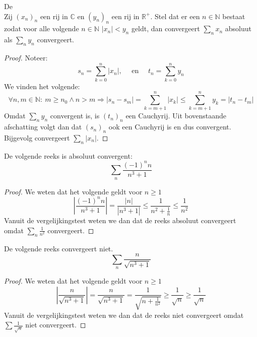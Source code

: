 \documentclass[main.tex]{subfiles}
\begin{document}
\begin{bst}
  \label{st:vergelijkingstest}
  De \\
  Zij $(x_{n})_{n}$ een rij in $\mathbb{C}$ en $(y_{n})_{n}$ een rij in $\mathbb{R}^{+}$.
  Stel dat er een $n\in \mathbb{N}$ bestaat zodat voor alle volgende $n\in \mathbb{N}$ $|x_{n}| < y_{n}$ geldt, dan convergeert $\sum_{n}x_{n}$ absoluut als $\sum_{n}y_{n}$ convergeert.

  \begin{proof}
    Noteer:
    \[ 
    s_{n} = \sum_{k=0}^{n}|x_{n}|,\quad
    \text{ en }\quad
    t_{n} = \sum_{k=0}^{n}y_{n}
    \]
    We vinden het volgende:
    \[ \forall n,m\in \mathbb{N}:\ m \ge n_{0} \wedge n > m \Rightarrow |s_{n}-s_{m}| = \sum_{k=m+1}^{n}|x_{k}| \le \sum_{k=m+1}^{n}y_{k} = |t_{n}-t_{m}| \]
    Omdat $\sum_{n}y_{n}$ convergent is, is $(t_{n})_{n}$ een Cauchyrij.
    Uit bovenstaande afschatting volgt dan dat $(s_{n})_{n}$ ook een Cauchyrij is en dus convergent.
    Bijgevolg convergeert $\sum_{n}|x_{n}|$.
  \end{proof}
\end{bst}

\begin{vb}
  De volgende reeks is absoluut convergent:
  \[ \sum_{n}\frac{(-1)^{n}n}{n^{3}+1} \]
  
  \begin{proof}
    We weten dat het volgende geldt voor $n\ge 1$
    \[
    \left| \frac{(-1)^{n}n}{n^{3}+1} \right|
    = \frac{|n|}{|n^{3}+1|}
    \le \frac{1}{n^{2}+ \frac{1}{n}}
    \le \frac{1}{n^{2}} \]
    Vanuit de vergelijkingstest weten we dan dat de reeks absoluut convergeert omdat $\sum_{n}\frac{1}{n^{2}}$ convergeert.
  \end{proof}
\end{vb}

\begin{vb}
  De volgende reeks convergeert niet.
  \[ \sum_{n}\frac{n}{\sqrt{n^{3}+1}} \]

  \begin{proof}
    We weten dat het volgende geldt voor $n\ge 1$
    \[
    \left| \frac{n}{\sqrt{n^{3}+1}}\right|
    = \frac{n}{\sqrt{n^{3}+1}}
    = \frac{1}{\sqrt{n + \frac{1}{n^{2}}}}
    \ge \frac{1}{\sqrt{n}}
    \ge \frac{1}{\sqrt{n}}
    \]
    Vanuit de vergelijkingstest weten we dan dat de reeks niet convergeert omdat $\sum\frac{1}{\sqrt{n}}$ niet convergeert.
  \end{proof}
\end{vb}
\end{document}

